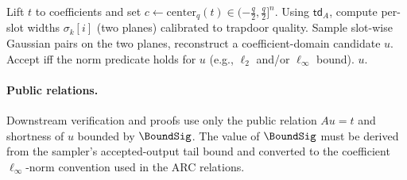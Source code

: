 \begin{algorithm}[H]
\caption{\(\SampPre(\mathsf{td}_A,t)\): two-plane hybrid sampler (sketch)}
\label{alg:samppre}
\begin{algorithmic}[1]
\State Lift \(t\) to coefficients and set \(c \gets \mathrm{center}_q(t)\in(-\frac{q}{2},\frac{q}{2}]^n\).
\State Using \(\mathsf{td}_A\), compute per-slot widths \(\sigma_k[i]\) (two planes) calibrated to trapdoor quality.
\Repeat
  \State Sample slot-wise Gaussian pairs on the two planes, reconstruct a coefficient-domain candidate \(u\).
  \State Accept iff the norm predicate holds for \(u\) (e.g., \(\ell_2\) and/or \(\ell_\infty\) bound).
\State \Return \(u\).
\end{algorithmic}
\end{algorithm}

\paragraph{Public relations.}
Downstream verification and proofs use only the public relation \(A u=t\) and shortness of \(u\) bounded by
\(\BoundSig\).  The value of \(\BoundSig\) must be derived from the sampler's accepted-output tail bound and
converted to the coefficient \(\ell_\infty\)-norm convention used in the ARC relations.
